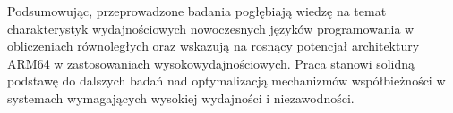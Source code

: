 Podsumowując, przeprowadzone badania pogłębiają wiedzę na temat charakterystyk wydajnościowych nowoczesnych języków programowania w obliczeniach równoległych oraz wskazują na rosnący potencjał architektury ARM64 w zastosowaniach wysokowydajnościowych. Praca stanowi solidną podstawę do dalszych badań nad optymalizacją mechanizmów współbieżności w systemach wymagających wysokiej wydajności i niezawodności.


